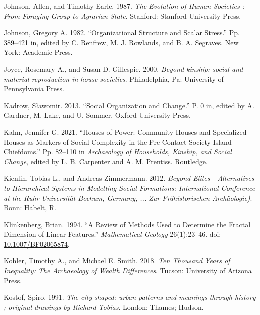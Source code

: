 \documentclass[
  12pt,
]{book}
\newlength{\cslhangindent}
\newlength{\cslentryspacingunit} %
\newenvironment{CSLReferences}[2] %
 {%
  \setlength{\parindent}{0pt}
  \ifodd #1
  \let\oldpar\par
  \def\par{\hangindent=\cslhangindent\oldpar}
  \fi
  \setlength{\parskip}{#2\cslentryspacingunit}
 }%
 {}
\begin{document}
\begin{CSLReferences}{1}{0}
\leavevmode{}%
Johnson, Allen, and Timothy Earle. 1987. \emph{The Evolution of Human Societies : From Foraging Group to Agrarian State}. Stanford: Stanford University Press.

\leavevmode{}%
Johnson, Gregory A. 1982. {``Organizational Structure and Scalar Stress.''} Pp. 389--421 in, edited by C. Renfrew, M. J. Rowlands, and B. A. Segraves. New York: Academic Press.

\leavevmode{}%
Joyce, Rosemary A., and Susan D. Gillespie. 2000. \emph{Beyond kinship: social and material reproduction in house societies}. Philadelphia, Pa: University of Pennsylvania Press.

\leavevmode{}%
Kadrow, Sławomir. 2013. {``\href{https://doi.org/10.1093/oxfordhb/9780199567942.013.023}{Social Organization and Change}.''} P. 0 in, edited by A. Gardner, M. Lake, and U. Sommer. Oxford University Press.

\leavevmode{}%
Kahn, Jennifer G. 2021. {``Houses of Power: {Community} Houses and Specialized Houses as Markers of Social Complexity in the Pre-Contact {Society Island} Chiefdoms.''} Pp. 82--110 in \emph{Archaeology of {Households}, {Kinship}, and {Social Change}}, edited by L. B. Carpenter and A. M. Prentiss. {Routledge}.

\leavevmode{}%
Kienlin, Tobias L., and Andreas Zimmermann. 2012. \emph{Beyond Elites - Alternatives to Hierarchical Systems in Modelling Social Formations: International Conference at the Ruhr-Universität Bochum, Germany, ... Zur Prähistorischen Archäologie)}. Bonn: Habelt, R.

\leavevmode{}%
Klinkenberg, Brian. 1994. {``A Review of Methods Used to Determine the Fractal Dimension of Linear Features.''} \emph{Mathematical Geology} 26(1):23--46. doi: \href{https://doi.org/10.1007/BF02065874}{10.1007/BF02065874}.

\leavevmode{}%
Kohler, Timothy A., and Michael E. Smith. 2018. \emph{Ten Thousand Years of Inequality: The Archaeology of Wealth Differences}. Tucson: University of Arizona Press.

\leavevmode{}%
Kostof, Spiro. 1991. \emph{The city shaped: urban patterns and meanings through history ; original drawings by Richard Tobias}. London: Thames; Hudson.


\end{CSLReferences}
\end{document}
